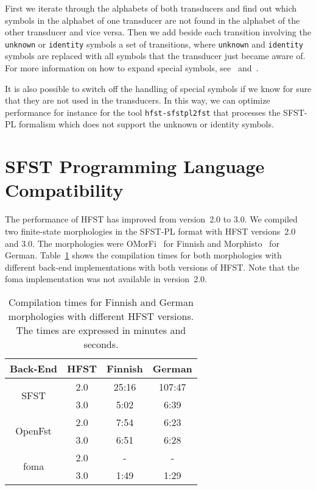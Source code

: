 \documentclass{llncs}
\begin{document}
First we iterate through the alphabets of both transducers and find
out which symbols in the alphabet of one transducer are not found in
the alphabet of the other transducer and vice versa. 
Then we add beside each transition involving the \texttt{unknown} or 
\texttt{identity} symbols a set of transitions, where \texttt{unknown} 
and \texttt{identity} symbols are
replaced with all symbols that the transducer just became aware of. 
For more information on how to expand special symbols, 
see~\cite{hulden/2009} and~\cite{beesley/2003}.

It is also possible to switch off the handling of special symbols if we know
for sure that they are not used in the transducers. 
In this way, we can optimize performance for instance for the tool 
{\tt hfst-sfstpl2fst} that processes the SFST-PL 
formalism which does not support the unknown or identity symbols.


\section{SFST Programming Language Compatibility}\label{hfst:sfst-compatibility}
The performance of HFST has improved from version~2.0 to 3.0. 
We compiled two finite-state morphologies in the SFST-PL format
with HFST versions~2.0 and 3.0. 
The morphologies were OMorFi~\cite{pirinen/2008} for Finnish and 
Morphisto~\cite{zielinski/2009} for German.
Table~\ref{tab:compilation_times} shows the compilation times 
for both morphologies with 
different back-end implementations with both versions of HFST. 
Note that the foma implementation was not available in version~2.0.

\begin{table}
\centering
  \caption{Compilation times for Finnish and German morphologies with
    different HFST versions. The times are expressed in minutes and seconds.}
  \label{tab:compilation_times}
  \begin{tabular}{ c  c  c  c }
\hline
  Back-End                  & HFST & Finnish & German \\ \hline
  \multirow{2}{*}{SFST}    & 2.0     & 25:16   & 107:47 \\
                           & 3.0     & 5:02    & 6:39 \\ \hline
  \multirow{2}{*}{OpenFst} & 2.0     & 7:54    & 6:23 \\
                           & 3.0     & 6:51    & 6:28 \\ \hline
  \multirow{2}{*}{foma}    & 2.0     & -       & - \\
                           & 3.0     & 1:49    & 1:29 \\ 
\hline
  \end{tabular}
\end{table}
\end{document}
